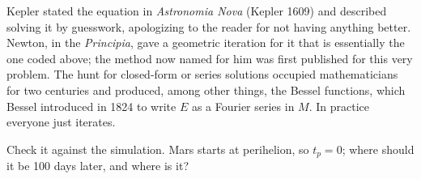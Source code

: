 \documentclass[
  10.5pt,
  letterpaper,
]{scrbook}
\theoremstyle{definition}
\theoremstyle{plain}
\theoremstyle{remark}
\begin{document}
\begin{tcolorbox}[enhanced jigsaw, arc=.35mm, bottomrule=.15mm, bottomtitle=1mm, breakable, colback=white, colbacktitle=quarto-callout-note-color!10!white, colframe=quarto-callout-note-color-frame, coltitle=black, left=2mm, leftrule=.75mm, opacityback=0, opacitybacktitle=0.6, rightrule=.15mm, title={Where it comes from}, titlerule=0mm, toprule=.15mm, toptitle=1mm]

Kepler stated the equation in \emph{Astronomia Nova} (Kepler 1609) and
described solving it by guesswork, apologizing to the reader for not
having anything better. Newton, in the \emph{Principia}, gave a
geometric iteration for it that is essentially the one coded above; the
method now named for him was first published for this very problem. The
hunt for closed-form or series solutions occupied mathematicians for two
centuries and produced, among other things, the Bessel functions, which
Bessel introduced in 1824 to write \(E\) as a Fourier series in \(M\).
In practice everyone just iterates.

\end{tcolorbox}

Check it against the simulation. Mars starts at perihelion, so
\(t_p = 0\); where should it be 100 days later, and where is it?
\end{document}

